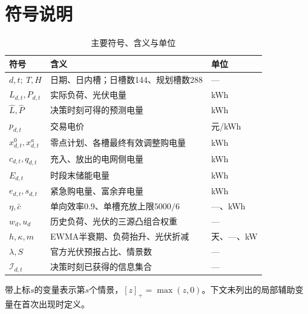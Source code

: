 \section{符号说明}
\begin{table}[htbp]\centering
\caption{主要符号、含义与单位}\label{tab:symbol}
\small
\begin{tabularx}{\textwidth}{p{}Xp{}}
\toprule
符号 & 含义 & 单位\\\midrule
$d,t;\ T,H$ & 日期、日内槽；日槽数144、规划槽数288 & ---\\
$L_{d,t},P_{d,t}$ & 实际负荷、光伏电量 & kWh\\
$\widehat L,\widehat P$ & 决策时刻可得的预测电量 & kWh\\
$p_{d,t}$ & 交易电价 & 元/kWh\\
$x^0_{d,t},x^a_{d,t}$ & 零点计划、各槽最终有效调整购电量 & kWh\\
$c_{d,t},q_{d,t}$ & 充入、放出的电网侧电量 & kWh\\
$E_{d,t}$ & 时段末储能电量 & kWh\\
$e_{d,t},s_{d,t}$ & 紧急购电量、富余弃电量 & kWh\\
$\eta,\bar c$ & 单向效率0.9、单槽充放上限$5000/6$ & ---、kWh\\
$w_d,u_d$ & 历史负荷、光伏的三源凸组合权重 & ---\\
$h,\kappa,m$ & EWMA半衰期、负荷抬升、光伏折减 & 天、---、kW\\
$\lambda,S$ & 官方光伏预报占比、情景数 & ---\\
$\mathcal I_{d,t}$ & 决策时刻已获得的信息集合 & ---\\
\bottomrule
\end{tabularx}
\end{table}
带上标$s$的变量表示第$s$个情景，$[z]_+=\max(z,0)$。下文未列出的局部辅助变量在首次出现时定义。

